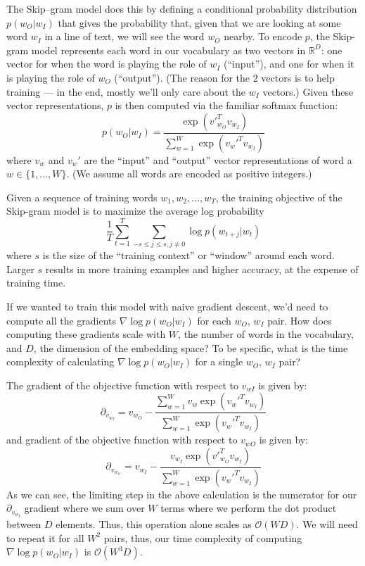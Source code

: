 The Skip--gram model does this by defining a conditional probability distribution $p(w_O|w_I)$ that gives the probability that, given that we are looking at some word $w_I$ in a line of text, we will see the word $w_O$ nearby.  To encode $p$, the Skip-gram model represents each word in our vocabulary as two vectors in $\mathbb{R}^D$: one vector for when the word is playing the role of $w_I$ (``input''), and one for when it is playing the role of $w_O$ (``output'').  (The reason for the 2 vectors is to help training --- in the end, mostly we'll only care about the $w_I$ vectors.)  Given these vector representations, $p$ is then computed via the familiar softmax function:
\[ p(w_O|w_I) = \frac{\exp \left({v'}_{w_O}^T v_{w_I} \right)}{\sum_{w=1}^W \exp \left( {v_w'}^T v_{w_I} \right)} \tag{2} \label{eqn:softmax} \]
where $v_w$ and $v_w'$ are the ``input'' and ``output'' vector representations of word a $w \in \{1, ..., W\}$.  (We assume all words are encoded as positive integers.)

Given a sequence of training words $w_1, w_2, \hdots, w_T$, the training objective of the Skip-gram model is to maximize the average log probability
\[ \frac{1}{T}  \sum_{t=1}^T \sum_{-s \leq j \leq s, j \neq 0} \log p(w_{t+j}|w_t) \tag{1}\label{eqn:opt} \] where $s$ is the size of the ``training context'' or ``window'' around each word. Larger $s$ results in more training examples and higher accuracy, at the expense of training time.

\problem[5]
If we wanted to train this model with naive gradient descent, we'd need to compute all the gradients $\nabla \log p(w_O|w_I)$ for each $w_O$, $w_I$ pair.  How does computing these gradients scale with $W$, the number of words in the vocabulary, and $D$, the dimension of the embedding space? To be specific, what is the time complexity of calculating $\nabla \log p(w_O|w_I)$ for a single $w_O$, $w_I$ pair?

\begin{solution}
 The gradient of the objective function with respect to $v_{wI}$ is given by:
 \begin{equation}
	 \partial_{v_{w_I}} = v_{w_O} -\frac{\sum_{w=1}^W v_{w}\exp \left( {v_w'}^T v_{w_I} \right)}{\sum_{w=1}^W \exp \left( {v_w'}^T v_{w_I} \right)}
 \end{equation}
 and gradient of the objective function with respect to $v_{wO}$ is given by:
 \begin{equation}
	\partial_{v_{w_O}} = v_{w_I} -\frac{v_{w_I}\exp \left({v'}_{w_O}^T v_{w_I} \right) }{\sum_{w=1}^W \exp \left( {v_w'}^T v_{w_I} \right)}
\end{equation}
As we can see, the limiting step in the above calculation is the numerator for our $\partial_{v_{w_I}}$ gradient where we sum over $W$ terms where we perform the dot product between $D$ elements. Thus, this operation alone scales as $\mathcal{O}(WD)$. We will need to repeat it for all $W^2$ pairs, thus, our time complexity of computing $\nabla \log p(w_O|w_I)$ is $\mathcal{O}(W^3D)$.
\end{solution}


